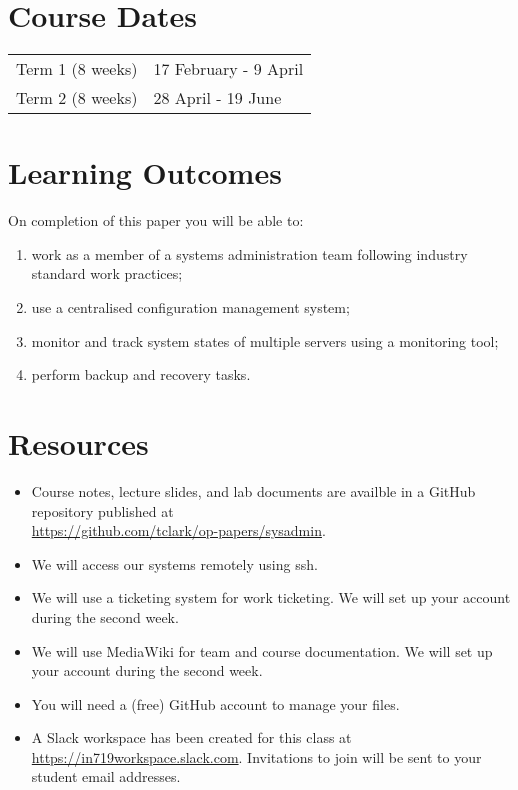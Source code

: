 \documentclass{article}
\begin{document}
\section*{Course Dates}
\begin{tabular}{ll}
Term 1 (8 weeks) & 17 February - 9 April\\
Term 2 (8 weeks) & 28 April - 19 June\\
\end{tabular}

\newpage 

\section*{Learning Outcomes}
On completion of this paper you will be able to:
\begin{enumerate}
  \item work as a member of a systems administration team following industry standard work practices;
  \item use a centralised configuration management system;
  \item monitor and track system states of multiple servers using a monitoring tool;
  \item perform backup and recovery tasks.
\end{enumerate}

\section*{Resources}
\begin{itemize}
	\item Course notes, lecture slides, and lab documents are availble in a GitHub repository published at \\ \url{https://github.com/tclark/op-papers/sysadmin}.
	\item We will access our systems remotely using ssh.
	\item We will use a ticketing system for work ticketing. We will set up your account during the second week.
	\item We will use MediaWiki for team and course documentation. We will set up your account during the second week.
	\item You will need a (free) GitHub account to manage your files.
	\item A Slack workspace has been created for this class at \url{https://in719workspace.slack.com}. Invitations to join will be sent to your student email addresses.
\end{itemize}
\end{document}
